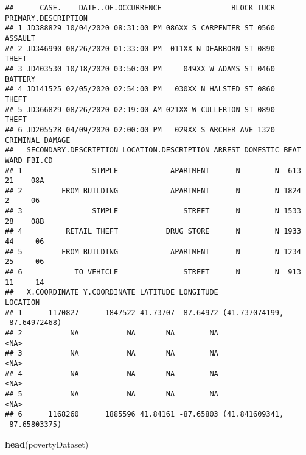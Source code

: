 \documentclass[
]{article}
\newenvironment{Shaded}{\begin{snugshade}}{\end{snugshade}}
\newcommand{\KeywordTok}[1]{\textcolor[rgb]{0.13,0.29,0.53}{\textbf{#1}}}
\newcommand{\NormalTok}[1]{#1}
\begin{document}
\begin{verbatim}
##      CASE.    DATE..OF.OCCURRENCE                BLOCK IUCR PRIMARY.DESCRIPTION
## 1 JD388829 10/04/2020 08:31:00 PM 086XX S CARPENTER ST 0560             ASSAULT
## 2 JD346990 08/26/2020 01:33:00 PM  011XX N DEARBORN ST 0890               THEFT
## 3 JD403530 10/18/2020 03:50:00 PM     049XX W ADAMS ST 0460             BATTERY
## 4 JD141525 02/05/2020 02:54:00 PM   030XX N HALSTED ST 0860               THEFT
## 5 JD366829 08/26/2020 02:19:00 AM 021XX W CULLERTON ST 0890               THEFT
## 6 JD205528 04/09/2020 02:00:00 PM   029XX S ARCHER AVE 1320     CRIMINAL DAMAGE
##   SECONDARY.DESCRIPTION LOCATION.DESCRIPTION ARREST DOMESTIC BEAT WARD FBI.CD
## 1                SIMPLE            APARTMENT      N        N  613   21    08A
## 2         FROM BUILDING            APARTMENT      N        N 1824    2     06
## 3                SIMPLE               STREET      N        N 1533   28    08B
## 4          RETAIL THEFT           DRUG STORE      N        N 1933   44     06
## 5         FROM BUILDING            APARTMENT      N        N 1234   25     06
## 6            TO VEHICLE               STREET      N        N  913   11     14
##   X.COORDINATE Y.COORDINATE LATITUDE LONGITUDE                     LOCATION
## 1      1170827      1847522 41.73707 -87.64972 (41.737074199, -87.64972468)
## 2           NA           NA       NA        NA                         <NA>
## 3           NA           NA       NA        NA                         <NA>
## 4           NA           NA       NA        NA                         <NA>
## 5           NA           NA       NA        NA                         <NA>
## 6      1168260      1885596 41.84161 -87.65803 (41.841609341, -87.65803375)
\end{verbatim}

\begin{Shaded}
\begin{Highlighting}[]
\KeywordTok{head}\NormalTok{(povertyDataset)}
\end{Highlighting}
\end{Shaded}
\end{document}

